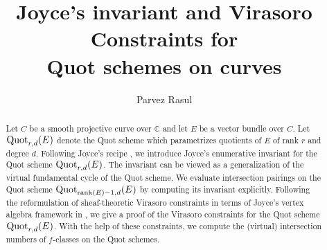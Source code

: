 \documentclass[11pt]{amsart}
\theoremstyle{remark}
\newcommand{\mb}[1]{\mathbb{#1}}
\newcommand{\rk}{\textnormal{rank}}
\newcommand{\quot}[0]{\textnormal{Quot}}
\numberwithin{theorem}{section}
\begin{document}
	
	\title[Joyce's invariant and Virasoro Constraints for Quot schemes]{Joyce's invariant and Virasoro Constraints for \\ Quot schemes on curves}
    
    \author[Parvez Rasul]{Parvez Rasul} 
	
	\address{School of Mathematics, Korea Institute for Advanced Study, 85 Hoegiro, Dongdaemun-gu, Seoul 02455, Republic of Korea}



    \begin{abstract}
    Let $C$ be a smooth projective curve over $\mb C$ and let $E$ be a vector bundle over $C$.
    Let $\quot_{r,d}(E)$ denote the Quot scheme which parametrizes quotients of $E$ of rank $r$ and degree $d$.
    Following Joyce's recipe \cite{Joy21}, we introduce Joyce's enumerative invariant for the Quot scheme $\quot_{r,d}(E)$.
    The invariant can be viewed as a generalization of the virtual fundamental cycle of the Quot scheme. 
    We evaluate intersection pairings on the Quot scheme $\quot_{\rk(E)-1,d}(E)$ by computing its invariant explicitly.
    Following the reformulation of sheaf-theoretic Virasoro constraints
    in terms of Joyce's vertex algebra framework in \cite{BLM24},
    we give a proof of the Virasoro constraints for the Quot scheme $\quot_{r,d}(E)$.
    With the help of these constraints, 
    we compute the (virtual) intersection numbers of $f$-classes on the Quot schemes.
    \end{abstract}
    
	\maketitle
    
\end{document}
